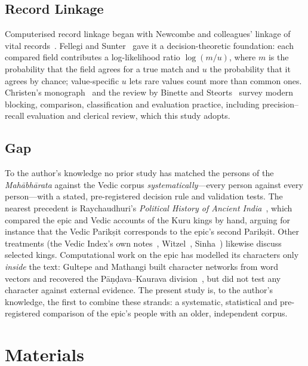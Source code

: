 \documentclass[journal]{IEEEtran}
\newcommand{\MBh}{\textit{Mahābhārata}}
\begin{document}
\subsection{Record Linkage}
Computerised record linkage began with Newcombe and colleagues' linkage of vital records~\cite{newcombe1959}.
Fellegi and Sunter~\cite{fellegi1969} gave it a decision-theoretic foundation: each compared field contributes a
log-likelihood ratio $\log(m/u)$, where $m$ is the probability that the field agrees for a true match and $u$ the
probability that it agrees by chance; value-specific $u$ lets rare values count more than common ones. Christen's
monograph~\cite{christen2012} and the review by Binette and Steorts~\cite{binette2022} survey modern blocking,
comparison, classification and evaluation practice, including precision--recall evaluation and clerical review,
which this study adopts.

\subsection{Gap}
To the author's knowledge no prior study has matched the persons of the \MBh{} against the Vedic corpus
\emph{systematically}---every person against every person---with a stated, pre-registered decision rule and
validation tests. The nearest precedent is Raychaudhuri's \textit{Political History of Ancient India}~\cite{raychaudhuri1923},
which compared the epic and Vedic accounts of the Kuru kings by hand, arguing for instance that the Vedic Parikṣit
corresponds to the epic's second Parikṣit. Other treatments (the Vedic Index's own notes~\cite{macdonell1912},
Witzel~\cite{witzel1995}, Sinha~\cite{sinha2021}) likewise discuss selected kings. Computational work on the epic has
modelled its characters only \emph{inside} the text: Gultepe and Mathangi built character networks from word vectors and
recovered the Pāṇḍava--Kaurava division~\cite{gultepe2023}, but did not test any character against external evidence.
The present study is, to the author's knowledge, the first to combine these strands: a systematic, statistical and
pre-registered comparison of the epic's people with an older, independent corpus.

\section{Materials}
\end{document}
